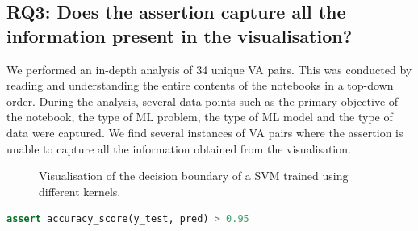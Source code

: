 \documentclass[conference]{IEEEtran}
\begin{document}
\subsection{RQ3: Does the assertion capture all the information present in the visualisation?}\label{sec:result-rq3}

We performed an in-depth analysis of 34 unique VA pairs. This was conducted by reading and understanding the entire contents of the notebooks in a top-down order. During the analysis, several data points such as the primary objective of the notebook, the type of ML problem, the type of ML model and the type of data were captured. We find several instances of VA pairs where the assertion is unable to capture all the information obtained from the visualisation.

\begin{figure}
  \hfill
  \caption{Visualisation of the decision boundary of a SVM trained using different kernels.}\label{fig:svm}
\end{figure}

\begin{lstlisting}[language=Python, caption={Assertion on the accuracy of the ML model.}, label={lst:svm}]
assert accuracy_score(y_test, pred) > 0.95
\end{lstlisting}
\end{document}
